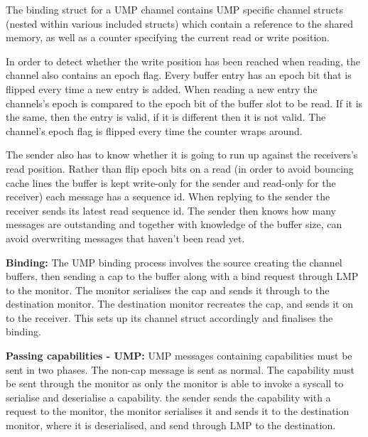 \documentclass[a4paper,twoside]{report} %
\begin{document}
The binding struct for a UMP channel contains UMP specific channel structs
(nested within various included structs) which contain a reference to the shared
memory, as well as a counter specifying the current read or write position.

In order to detect whether the write position has been reached when reading, the
channel also contains an epoch flag. Every buffer entry has an epoch bit that is
flipped every time a new entry is added. When reading a new entry the channels's
epoch is compared to the epoch bit of the buffer slot to be read. If it is the
same, then the entry is valid, if it is different then it is not valid. The
channel's epoch flag is flipped every time the counter wraps around.

The sender also has to know whether it is going to run up against the
receivers's read position. Rather than flip epoch bits on a read (in order to
avoid bouncing cache lines the buffer is kept write-only for the sender and
read-only for the receiver) each message has a sequence id. When replying to the
sender the receiver sends its latest read sequence id. The sender then knows how
many messages are outstanding and together with knowledge of the buffer size,
can avoid overwriting messages that haven't been read yet.

\textbf{Binding:} The UMP binding process involves the source creating the
channel buffers, then sending a cap to the buffer along with a bind request
through LMP to the monitor. The monitor serialises the cap and sends it through
to the destination monitor. The destination monitor recreates the cap, and sends
it on to the receiver. This sets up its channel struct accordingly and finalises
the binding.

\textbf{Passing capabilities - UMP:} UMP messages containing capabilities must
be sent in two phases. The non-cap message is sent as normal. The capability
must be sent through the monitor as only the monitor is able to invoke a syscall
to serialise and deserialise a capability. the sender sends the capability with
a request to the monitor, the monitor serialises it and sends it to the
destination monitor, where it is deserialised, and send through LMP to the
destination.





\end{document}
